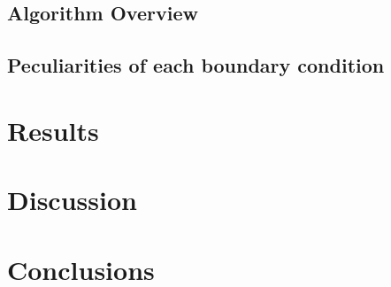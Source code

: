 \documentclass[fleqn,usenatbib]{mnras}
\begin{document}
\subsection{Algorithm Overview}
\label{Algorithm Overview}



\subsection{Peculiarities of each boundary condition}
\label{peculiarities}








\FloatBarrier

\section{Results}
\label{Results}


\FloatBarrier





\FloatBarrier





\FloatBarrier


\FloatBarrier




\section{Discussion}
\label{discussion}



\FloatBarrier
\section{Conclusions}






\end{document}
